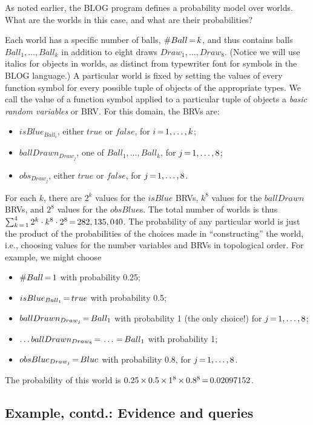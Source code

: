 \documentclass[12pt]{article}
\begin{document}
As noted earlier, the BLOG program defines a probability model over worlds. 
What are the worlds in this case, and what are their probabilities?

Each world has a specific number of balls, $\#Ball{\,{=}\,} k$, and thus contains
balls $Ball_1,\ldots,Ball_k$ in addition to eight draws $Draw_1,\ldots,Draw_8$.
(Notice we will use italics for objects in worlds, as distinct from
typewriter font for symbols in the BLOG language.)
A particular world is fixed by setting the values of every function symbol
for every possible tuple of objects of the appropriate types. We call
the value of a function symbol applied to a particular tuple of objects
a {\em basic random variables} or BRV. For this domain, the BRVs are:
\begin{itemize}
\item $isBlue_{Ball_i}$, either $true$ or $false$, for $i{\,{=}\,}1,\ldots,k$;
\item $ballDrawn_{Draw_j}$, one of $Ball_1,\ldots,Ball_k$,  for $j{\,{=}\,}1,\ldots,8$;
\item $obs_{Draw_j}$, either $true$ or $false$,  for $j{\,{=}\,}1,\ldots,8$.
\end{itemize}
For each $k$, there are $2^k$ values for the $isBlue$ BRVs,
$k^8$ values for the $ballDrawn$ BRVs, and $2^8$ values for
the $obsBlue$s. The total number of worlds is thus
$\sum_{k{\,{=}\,} 1}^4 2^k \cdot k^8 \cdot 2^8 {\,{=}\,} 282,135,040$.
The probability of any particular world is just the product of the probabilities 
of the choices made in ``constructing'' the world, i.e., choosing values
for the number variables and BRVs in topological order. For example, we might choose
\begin{itemize}
\item $\#Ball{\,{=}\,} 1$ with probability 0.25;
\item $isBlue_{Ball_1}{\,{=}\,} true$ with probability 0.5;
\item $ballDrawn_{Draw_j}{\,{=}\,} Ball_1$ with probability 1 (the only choice!) for $j{\,{=}\,}1,\ldots,8$;
\item $\ldots ballDrawn_{Draw_8}{\,{=}\,} \ldots {\,{=}\,} Ball_1$ with probability 1;
\item $obsBlue_{Draw_j}{\,{=}\,} Blue$ with probability 0.8, for $j{\,{=}\,}1,\ldots,8$.
\end{itemize}
The probability of this world is $0.25 {\,\times\,} 0.5 {\,\times\,} 1^8 {\,\times\,} 0.8^8{\,{=}\,} 0.02097152$.

\subsection{Example, contd.: Evidence and queries}
\end{document}
